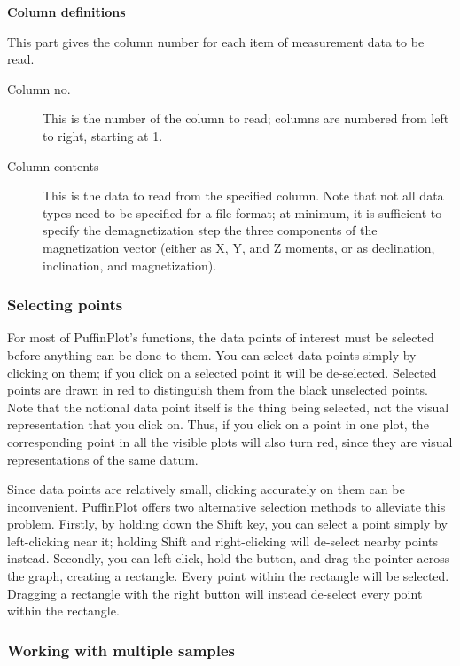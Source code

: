 \documentclass[a4paper,british]{article}
\newcommand{\ppcmd}[1]{\textsf{#1}} %
\newcommand{\mypara}[1]{\noindent\textbf{#1}

\noindent\ignorespaces} %
\begin{document}
\mypara{Column definitions} This part gives the column number for each
item of measurement data to be read.

\begin{description}

\item[Column no.] This is the number of the column to read; columns are
  numbered from left to right, starting at 1.

\item[Column contents] This is the data to read from the specified column.
  Note that not all data types need to be specified for a file format; at
  minimum, it is sufficient to specify the demagnetization step the three
  components of the magnetization vector (either as X, Y, and Z moments, or
  as declination, inclination, and magnetization).

\end{description}

\subsubsection{Selecting points}

For most of PuffinPlot's functions, the data points of interest must be
selected before anything can be done to them. You can select data points
simply by clicking on them; if you click on a selected point it will be
de-selected. Selected points are drawn in red to distinguish them from the
black unselected points. Note that the notional data point itself is the
thing being selected, not the visual representation that you click on. Thus,
if you click on a point in one plot, the corresponding point in all the
visible plots will also turn red, since they are visual representations of
the same datum.

Since data points are relatively small, clicking accurately on them can be
inconvenient. PuffinPlot offers two alternative selection methods to
alleviate this problem. Firstly, by holding down the \ppcmd{Shift} key, you
can select a point simply by left-clicking near it; holding \ppcmd{Shift} and
right-clicking will de-select nearby points instead. Secondly, you can
left-click, hold the button, and drag the pointer across the graph, creating
a rectangle. Every point within the rectangle will be selected. Dragging a
rectangle with the right button will instead de-select every point within the
rectangle.

\subsubsection{Working with multiple samples}
\end{document}
